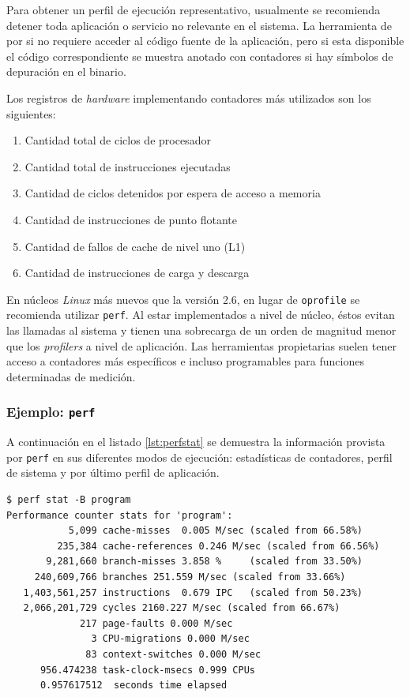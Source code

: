 \documentclass[a4paper]{report}
\begin{document}
\bigskip

Para obtener un perfil de ejecución representativo, usualmente se recomienda detener toda aplicación o servicio no relevante en el sistema. 
La herramienta de por si no requiere acceder al código fuente de la aplicación, pero si esta disponible el código correspondiente se muestra anotado con contadores
si hay símbolos de depuración en el binario.

\bigskip

Los registros de {\it hardware} implementando contadores más utilizados son los siguientes:

\begin{enumerate}
\item Cantidad total de ciclos de procesador
\item Cantidad total de instrucciones ejecutadas
\item Cantidad de ciclos detenidos por espera de acceso a memoria
\item Cantidad de instrucciones de punto flotante
\item Cantidad de fallos de cache de nivel uno (L1)
\item Cantidad de instrucciones de carga y descarga
\end{enumerate}

En núcleos {\it Linux} más nuevos que la versión 2.6, en lugar de {\tt oprofile} se recomienda utilizar {\tt perf}. Al estar implementados a nivel de núcleo, éstos evitan las llamadas al sistema y tienen una sobrecarga de un orden de magnitud menor que los {\it profilers} a nivel de aplicación. Las herramientas propietarias suelen tener acceso a contadores más específicos e
incluso programables para funciones determinadas de medición.

\subsubsection{Ejemplo: {\tt perf}}

A continuación en el listado \ref{lst:perfstat} se demuestra la información provista por {\tt perf} en sus diferentes modos de ejecución: estadísticas de contadores, perfil de sistema y
por último perfil de aplicación.

\begin{lstlisting}[caption={Estadísticas de Contadores},label={lst:perfstat}]
$ perf stat -B program
Performance counter stats for 'program':
           5,099 cache-misses  0.005 M/sec (scaled from 66.58%)
         235,384 cache-references 0.246 M/sec (scaled from 66.56%)
       9,281,660 branch-misses 3.858 %     (scaled from 33.50%)
     240,609,766 branches 251.559 M/sec (scaled from 33.66%)
   1,403,561,257 instructions  0.679 IPC   (scaled from 50.23%)
   2,066,201,729 cycles 2160.227 M/sec (scaled from 66.67%)
             217 page-faults 0.000 M/sec
               3 CPU-migrations 0.000 M/sec
              83 context-switches 0.000 M/sec
      956.474238 task-clock-msecs 0.999 CPUs
      0.957617512  seconds time elapsed
\end{lstlisting}
\end{document}
